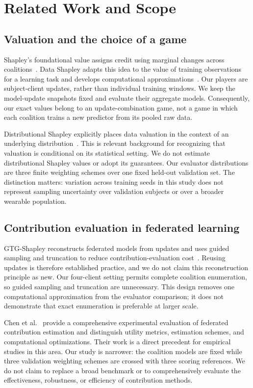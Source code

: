 \documentclass[conference,letterpaper]{IEEEtran}
\begin{document}
\section{Related Work and Scope}
\subsection{Valuation and the choice of a game}
Shapley's foundational value assigns credit using marginal changes across coalitions~\cite{shapley}. Data Shapley adapts this idea to the value of training observations for a learning task and develops computational approximations~\cite{datashapley}. Our players are subject-client updates, rather than individual training windows. We keep the model-update snapshots fixed and evaluate their aggregate models. Consequently, our exact values belong to an update-combination game, not a game in which each coalition trains a new predictor from its pooled raw data.

Distributional Shapley explicitly places data valuation in the context of an underlying distribution~\cite{distributional}. This is relevant background for recognizing that valuation is conditional on its statistical setting. We do not estimate distributional Shapley values or adopt its guarantees. Our evaluator distributions are three finite weighting schemes over one fixed held-out validation set. The distinction matters: variation across training seeds in this study does not represent sampling uncertainty over validation subjects or over a broader wearable population.

\subsection{Contribution evaluation in federated learning}
GTG-Shapley reconstructs federated models from updates and uses guided sampling and truncation to reduce contribution-evaluation cost~\cite{gtg}. Reusing updates is therefore established practice, and we do not claim this reconstruction principle as new. Our four-client setting permits complete coalition enumeration, so guided sampling and truncation are unnecessary. This design removes one computational approximation from the evaluator comparison; it does not demonstrate that exact enumeration is preferable at larger scale.

Chen et al.~\cite{flce} provide a comprehensive experimental evaluation of federated contribution estimation and distinguish utility metrics, estimation schemes, and computational optimizations. Their work is a direct precedent for empirical studies in this area. Our study is narrower: the coalition models are fixed while three validation weighting schemes are crossed with three scoring references. We do not claim to replace a broad benchmark or to comprehensively evaluate the effectiveness, robustness, or efficiency of contribution methods.
\end{document}
